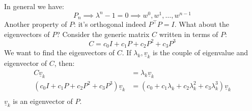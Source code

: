 In general we have:
\[
    P_n \implies \lambda^n - 1 = 0 \implies w^0, w^1, \dots, w^{n-1}
\]
Another property of $P$: it's orthogonal indeed $P^\intercal P = I$.
What about the eigenvectors of $P$? Consider the generic matrix $C$ written in terms of $P$:
\[
    C = c_0 I + c_1 P + c_2 P^2 + c_3 P^3    
\]
We want to find the eigenvectors of $C$. If $\lambda_k, \underline{v}_k$ is the couple of eigenvalue and eigenvector of $C$, then:
\[
    \begin{split}
        C\underline{v}_k &= \lambda_k \underline{v}_k\\
        (c_0 I + c_1 P + c_2 P^2 + c_3 P^3)\underline{v}_k &= (c_0 + c_1 \lambda_k + c_2 \lambda_k^2 + c_3 \lambda_k^3)\underline{v}_k\\
    \end{split}
\]
$\underline{v}_k$ is an eigenvector of $P$.\\

